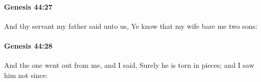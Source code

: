 		\paragraph{Genesis 44:27} %
			\label{GENESIS-44-27}

			And thy servant my father said unto us, Ye know that my wife bare me two sons:


		\paragraph{Genesis 44:28} %
			\label{GENESIS-44-28}

			And the one went out from me, and I said, Surely he is torn in pieces; and I saw him not since:


